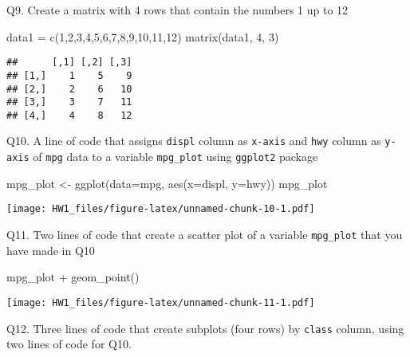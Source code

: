 \documentclass[
]{article}
\newenvironment{Shaded}{\begin{snugshade}}{\end{snugshade}}
\newcommand{\AttributeTok}[1]{\textcolor[rgb]{0.77,0.63,0.00}{#1}}
\newcommand{\DecValTok}[1]{\textcolor[rgb]{0.00,0.00,0.81}{#1}}
\newcommand{\FunctionTok}[1]{\textcolor[rgb]{0.00,0.00,0.00}{#1}}
\newcommand{\NormalTok}[1]{#1}
\newcommand{\OtherTok}[1]{\textcolor[rgb]{0.56,0.35,0.01}{#1}}
\newcommand{\SpecialCharTok}[1]{\textcolor[rgb]{0.00,0.00,0.00}{#1}}
\begin{document}
Q9. Create a matrix with 4 rows that contain the numbers 1 up to 12

\begin{Shaded}
\begin{Highlighting}[]
\NormalTok{data1 }\OtherTok{=} \FunctionTok{c}\NormalTok{(}\DecValTok{1}\NormalTok{,}\DecValTok{2}\NormalTok{,}\DecValTok{3}\NormalTok{,}\DecValTok{4}\NormalTok{,}\DecValTok{5}\NormalTok{,}\DecValTok{6}\NormalTok{,}\DecValTok{7}\NormalTok{,}\DecValTok{8}\NormalTok{,}\DecValTok{9}\NormalTok{,}\DecValTok{10}\NormalTok{,}\DecValTok{11}\NormalTok{,}\DecValTok{12}\NormalTok{)}
\FunctionTok{matrix}\NormalTok{(data1, }\DecValTok{4}\NormalTok{, }\DecValTok{3}\NormalTok{)}
\end{Highlighting}
\end{Shaded}

\begin{verbatim}
##      [,1] [,2] [,3]
## [1,]    1    5    9
## [2,]    2    6   10
## [3,]    3    7   11
## [4,]    4    8   12
\end{verbatim}

Q10. A line of code that assigns \texttt{displ} column as
\texttt{x-axis} and \texttt{hwy} column as \texttt{y-axis} of
\texttt{mpg} data to a variable \texttt{mpg\_plot} using
\texttt{ggplot2} package

\begin{Shaded}
\begin{Highlighting}[]
\NormalTok{mpg\_plot }\OtherTok{\textless{}{-}} \FunctionTok{ggplot}\NormalTok{(}\AttributeTok{data=}\NormalTok{mpg, }\FunctionTok{aes}\NormalTok{(}\AttributeTok{x=}\NormalTok{displ, }\AttributeTok{y=}\NormalTok{hwy))}
\NormalTok{mpg\_plot}
\end{Highlighting}
\end{Shaded}

\texttt{[image: HW1\_files/figure-latex/unnamed-chunk-10-1.pdf]}

Q11. Two lines of code that create a scatter plot of a variable
\texttt{mpg\_plot} that you have made in Q10

\begin{Shaded}
\begin{Highlighting}[]
\NormalTok{mpg\_plot }\SpecialCharTok{+} 
  \FunctionTok{geom\_point}\NormalTok{()}
\end{Highlighting}
\end{Shaded}

\texttt{[image: HW1\_files/figure-latex/unnamed-chunk-11-1.pdf]}

Q12. Three lines of code that create subplots (four rows) by
\texttt{class} column, using two lines of code for Q10.
\end{document}
